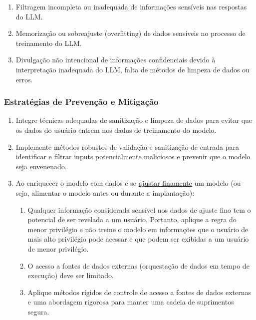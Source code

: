 \documentclass[
]{article}
\providecommand{\tightlist}{%
  \setlength{\itemsep}{0pt}\setlength{\parskip}{0pt}}
\begin{document}
\begin{enumerate}
\def\labelenumi{\arabic{enumi}.}
\tightlist
\item
  Filtragem incompleta ou inadequada de informações sensíveis nas
  respostas do LLM.
\item
  Memorização ou sobreajuste (overfitting) de dados sensíveis no
  processo de treinamento do LLM.
\item
  Divulgação não intencional de informações confidenciais devido à
  interpretação inadequada do LLM, falta de métodos de limpeza de dados
  ou erros.
\end{enumerate}

\subsubsection{Estratégias de Prevenção e
Mitigação}\label{estratuxe9gias-de-prevenuxe7uxe3o-e-mitigauxe7uxe3o}

\begin{enumerate}
\def\labelenumi{\arabic{enumi}.}
\tightlist
\item
  Integre técnicas adequadas de sanitização e limpeza de dados para
  evitar que os dados do usuário entrem nos dados de treinamento do
  modelo.
\item
  Implemente métodos robustos de validação e sanitização de entrada para
  identificar e filtrar inputs potencialmente maliciosos e prevenir que
  o modelo seja envenenado.
\item
  Ao enriquecer o modelo com dados e se
  \href{https://github.com/OWASP/www-project-top-10-for-large-language-model-applications/wiki/Definitions}{ajustar
  finamente} um modelo (ou seja, alimentar o modelo antes ou durante a
  implantação):

  \begin{enumerate}
  \def\labelenumii{\arabic{enumii}.}
  \tightlist
  \item
    Qualquer informação considerada sensível nos dados de ajuste fino
    tem o potencial de ser revelada a um usuário. Portanto, aplique a
    regra do menor privilégio e não treine o modelo em informações que o
    usuário de mais alto privilégio pode acessar e que podem ser
    exibidas a um usuário de menor privilégio.
  \item
    O acesso a fontes de dados externas (orquestação de dados em tempo
    de execução) deve ser limitado.
  \item
    Aplique métodos rígidos de controle de acesso a fontes de dados
    externas e uma abordagem rigorosa para manter uma cadeia de
    suprimentos segura.
  \end{enumerate}
\end{enumerate}
\end{document}
